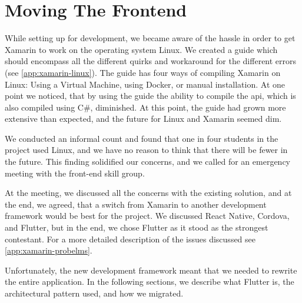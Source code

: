 \section{Moving The Frontend}

While setting up for development, we became aware of the hassle in order to get Xamarin to work on the operating system Linux. We created a guide which should encompass all the different quirks and workaround for the different errors (see \autoref{app:xamarin-linux}). The guide has four ways of compiling Xamarin on Linux: Using a Virtual Machine, using Docker, or manual installation. At one point we noticed, that by using the guide the ability to compile the \gls{api}, which is also compiled using C\#, diminished. At this point, the guide had grown more extensive than expected, and the future for Linux and Xamarin seemed dim.

We conducted an informal count and found that one in four students in the project used Linux, and we have no reason to think that there will be fewer in the future. This finding solidified our concerns, and we called for an emergency meeting with the front-end skill group.

At the meeting, we discussed all the concerns with the existing solution, and at the end, we agreed, that a switch from Xamarin to another development framework would be best for the project. We discussed React Native\cite{react-native:website}, Cordova\cite{cordova:website}, and Flutter\cite{flutter:website}, but in the end, we chose Flutter as it stood as the strongest contestant. For a more detailed description of the issues discussed see \autoref{app:xamarin-probelms}.

Unfortunately, the new development framework meant that we needed to rewrite the entire application. In the following sections, we describe what Flutter is, the architectural pattern used, and how we migrated.
